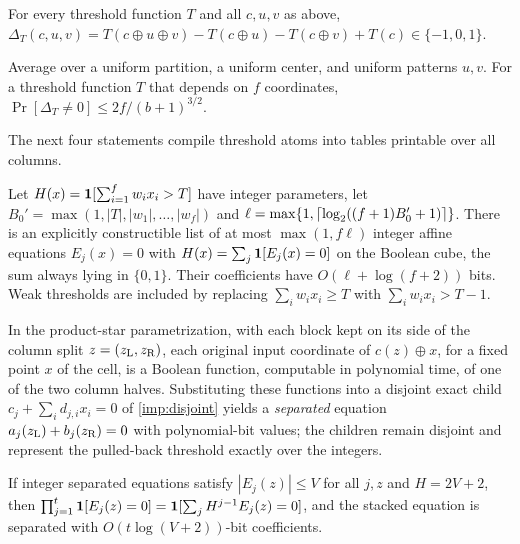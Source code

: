 \begin{imported}\label{imp:range}
For every threshold function \(T\) and all \(c,u,v\) as above,
\(\Delta_T(c,u,v)=T(c\oplus u\oplus v)-T(c\oplus u)-T(c\oplus v)+T(c)\in\{-1,0,1\}\).
\end{imported}

\begin{imported}\label{imp:population}
Average over a uniform partition, a uniform center, and uniform
patterns \(u,v\). For a threshold function \(T\) that depends on \(f\)
coordinates, \(\Pr[\Delta_T\ne0]\le2f/(b+1)^{3/2}\).
\end{imported}

The next four statements compile threshold atoms into tables
printable over all columns.

\begin{imported}\label{imp:disjoint}
Let \(H(x)=\mathbf 1[\sum_{i=1}^fw_ix_i>T]\) have integer parameters, let
\(B_0'=\max(1,|T|,|w_1|,\dots,|w_f|)\) and
\(\ell=\max\{1,\lceil\log_2((f+1)B_0'+1)\rceil\}\). There is an explicitly
constructible list of at most \(\max(1,f\ell)\) integer affine
equations \(E_j(x)=0\) with \(H(x)=\sum_j\mathbf 1[E_j(x)=0]\) on the
Boolean cube, the sum always lying in \(\{0,1\}\). Their coefficients
have \(O(\ell+\log(f+2))\) bits. Weak thresholds are included by
replacing \(\sum_iw_ix_i\ge T\) with \(\sum_iw_ix_i>T-1\).
\end{imported}

\begin{imported}\label{imp:pullback}
In the product-star parametrization, with each block kept on its side
of the column split \(z=(z_{\rm L},z_{\rm R})\), each original input
coordinate of \(c(z)\oplus x\), for a fixed point \(x\) of the cell, is
a Boolean function, computable in polynomial time, of one of the two
column halves. Substituting these functions into a disjoint exact
child \(c_j+\sum_id_{j,i}x_i=0\) of \cref{imp:disjoint} yields a
\emph{separated} equation \(a_j(z_{\rm L})+b_j(z_{\rm R})=0\) with
polynomial-bit values; the children remain disjoint and represent the
pulled-back threshold exactly over the integers.
\end{imported}

\begin{imported}\label{imp:stack}
If integer separated equations satisfy \(|E_j(z)|\le V\) for all
\(j,z\) and \(H=2V+2\), then
\(\prod_{j=1}^t\mathbf 1[E_j(z)=0]=\mathbf 1[\sum_jH^{j-1}E_j(z)=0]\), and the
stacked equation is separated with \(O(t\log(V+2))\)-bit
coefficients.
\end{imported}

